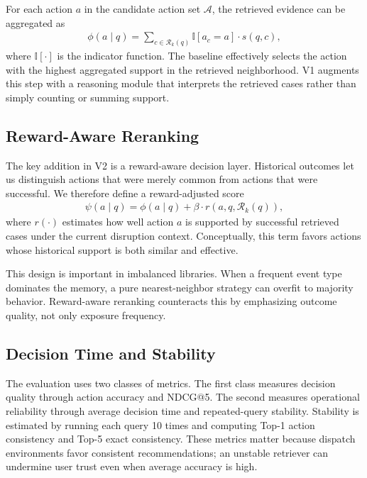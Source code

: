 \documentclass[conference]{IEEEtran}
\begin{document}
For each action $a$ in the candidate action set $\mathcal{A}$, the retrieved evidence can be aggregated as
\begin{align*}
\phi(a \mid q) = \sum_{c \in \mathcal{R}_k(q)} \mathbb{I}[a_c = a] \cdot s(q,c),
\end{align*}
where $\mathbb{I}[\cdot]$ is the indicator function. The baseline effectively selects the action with the highest aggregated support in the retrieved neighborhood. V1 augments this step with a reasoning module that interprets the retrieved cases rather than simply counting or summing support.

\subsection{Reward-Aware Reranking}

The key addition in V2 is a reward-aware decision layer. Historical outcomes let us distinguish actions that were merely common from actions that were successful. We therefore define a reward-adjusted score
\begin{align*}
\psi(a \mid q) = \phi(a \mid q) + \beta \cdot r(a,q,\mathcal{R}_k(q)),
\end{align*}
where $r(\cdot)$ estimates how well action $a$ is supported by successful retrieved cases under the current disruption context. Conceptually, this term favors actions whose historical support is both similar and effective.

This design is important in imbalanced libraries. When a frequent event type dominates the memory, a pure nearest-neighbor strategy can overfit to majority behavior. Reward-aware reranking counteracts this by emphasizing outcome quality, not only exposure frequency.

\subsection{Decision Time and Stability}

The evaluation uses two classes of metrics. The first class measures decision quality through action accuracy and NDCG@5. The second measures operational reliability through average decision time and repeated-query stability. Stability is estimated by running each query 10 times and computing Top-1 action consistency and Top-5 exact consistency. These metrics matter because dispatch environments favor consistent recommendations; an unstable retriever can undermine user trust even when average accuracy is high.
\end{document}
